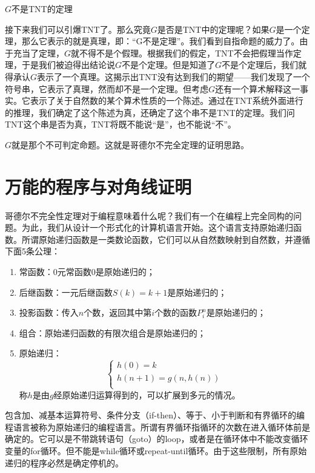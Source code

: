 \documentclass{article}
\begin{document}
\begin{center}
$G$不是TNT的定理
\end{center}

接下来我们可以引爆TNT了。那么究竟$G$是否是TNT中的定理呢？如果$G$是一个定理，那么它表示的就是真理，即：“G不是定理”。我们看到自指命题的威力了。由于充当了定理，$G$就不得不是个假理。根据我们的假定，TNT不会把假理当作定理，于是我们被迫得出结论说$G$不是个定理。但是知道了$G$不是个定理后，我们就得承认$G$表示了一个真理。这揭示出TNT没有达到我们的期望——我们发现了一个符号串，它表示了真理，然而却不是一个定理。但考虑$G$还有一个算术解释这一事实。它表示了关于自然数的某个算术性质的一个陈述。通过在TNT系统外面进行的推理，我们确定了这个陈述为真，还确定了这个串不是TNT的定理。我们问TNT这个串是否为真，TNT将既不能说“是”，也不能说“不”。

$G$就是那个不可判定命题。这就是哥德尔不完全定理的证明思路。

\section{万能的程序与对角线证明}
哥德尔不完全性定理对于编程意味着什么呢？我们有一个在编程上完全同构的问题。为此，我们从设计一个形式化的计算机语言开始。这个语言支持原始递归函数。所谓原始递归函数是一类数论函数，它们可以从自然数映射到自然数，并遵循下面5条公理：

\begin{enumerate}
\item 常函数：0元常函数0是原始递归的；
\item 后继函数：一元后继函数$S(k) = k + 1$是原始递归的；
\item 投影函数：传入$n$个数，返回其中第$i$个数的函数$P_i^n$是原始递归的；
\item 组合：原始递归函数的有限次组合是原始递归的；
\item 原始递归：
\[
\begin{cases}
h(0) = k \\
h(n + 1) = g(n, h(n)) \\
\end{cases}
\]
称$h$是由$g$经原始递归运算得到的，可以扩展到多元的情况。
\end{enumerate}

包含加、减基本运算符号、条件分支（if-then）、等于、小于判断和有界循环的编程语言被称为原始递归的编程语言。所谓有界循环指循环的次数在进入循环体前是确定的。它可以是不带跳转语句（goto）的loop，或者是在循环体中不能改变循环变量的for循环。但不能是while循环或repeat-until循环。由于这些限制，所有原始递归的程序必然是确定停机的。
\end{document}
